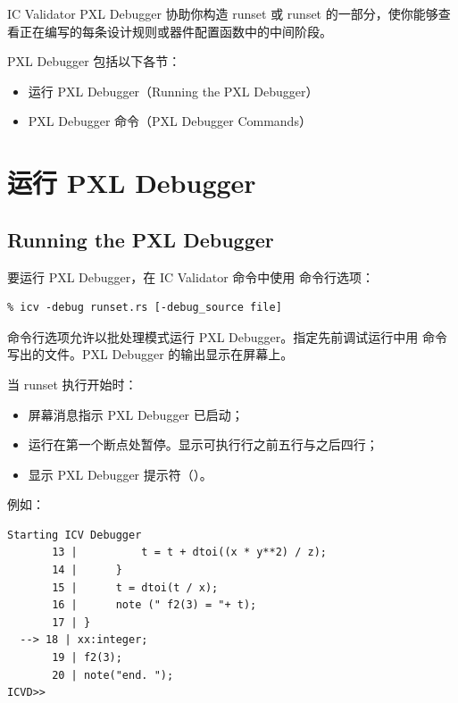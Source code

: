 \label{app:d}

IC Validator PXL Debugger 协助你构造 runset 或 runset 的一部分，使你能够查看正在编写的每条设计规则或器件配置函数中的中间阶段。

PXL Debugger 包括以下各节：
\begin{itemize}
  \item 运行 PXL Debugger（Running the PXL Debugger）
  \item PXL Debugger 命令（PXL Debugger Commands）
\end{itemize}

\section{运行 PXL Debugger}
\subsection*{Running the PXL Debugger}

要运行 PXL Debugger，在 IC Validator 命令中使用  命令行选项：

\begin{lstlisting}
% icv -debug runset.rs [-debug_source file]
\end{lstlisting}

 命令行选项允许以批处理模式运行 PXL Debugger。指定先前调试运行中用  命令写出的文件。PXL Debugger 的输出显示在屏幕上。

当 runset 执行开始时：
\begin{itemize}
  \item 屏幕消息指示 PXL Debugger 已启动；
  \item 运行在第一个断点处暂停。显示可执行行之前五行与之后四行；
  \item 显示 PXL Debugger 提示符（）。
\end{itemize}

例如：

\begin{lstlisting}
Starting ICV Debugger
       13 |          t = t + dtoi((x * y**2) / z);
       14 |      }
       15 |      t = dtoi(t / x);
       16 |      note (" f2(3) = "+ t);
       17 | }
  --> 18 | xx:integer;
       19 | f2(3);
       20 | note("end. ");
ICVD>>
\end{lstlisting}

